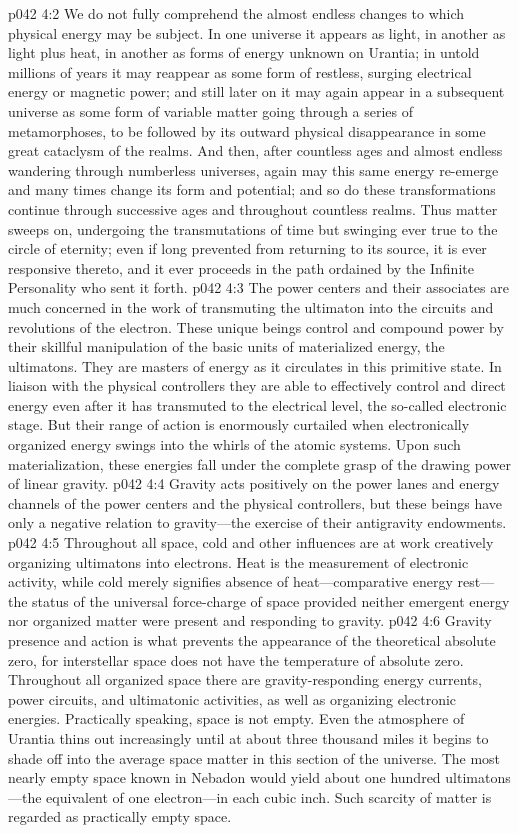 \vs p042 4:2 We do not fully comprehend the almost endless changes to which physical energy may be subject. In one universe it appears as light, in another as light plus heat, in another as forms of energy unknown on Urantia; in untold millions of years it may reappear as some form of restless, surging electrical energy or magnetic power; and still later on it may again appear in a subsequent universe as some form of variable matter going through a series of metamorphoses, to be followed by its outward physical disappearance in some great cataclysm of the realms. And then, after countless ages and almost endless wandering through numberless universes, again may this same energy re\hyp{}emerge and many times change its form and potential; and so do these transformations continue through successive ages and throughout countless realms. Thus matter sweeps on, undergoing the transmutations of time but swinging ever true to the circle of eternity; even if long prevented from returning to its source, it is ever responsive thereto, and it ever proceeds in the path ordained by the Infinite Personality who sent it forth.\plusone
\vs p042 4:3 The power centers and their associates are much concerned in the work of transmuting the ultimaton into the circuits and revolutions of the electron. These unique beings control and compound power by their skillful manipulation of the basic units of materialized energy, the ultimatons. They are masters of energy as it circulates in this primitive state. In liaison with the physical controllers they are able to effectively control and direct energy even after it has transmuted to the electrical level, the so\hyp{}called electronic stage. But their range of action is enormously curtailed when electronically organized energy swings into the whirls of the atomic systems. Upon such materialization, these energies fall under the complete grasp of the drawing power of linear gravity.
\vs p042 4:4 Gravity acts positively on the power lanes and energy channels of the power centers and the physical controllers, but these beings have only a negative relation to gravity---the exercise of their antigravity endowments.
\vs p042 4:5 Throughout all space, cold and other influences are at work creatively organizing ultimatons into electrons. Heat is the measurement of electronic activity, while cold merely signifies absence of heat---comparative energy rest---the status of the universal force\hyp{}charge of space provided neither emergent energy nor organized matter were present and responding to gravity.
\vs p042 4:6 Gravity presence and action is what prevents the appearance of the theoretical absolute zero, for interstellar space does not have the temperature of absolute zero. Throughout all organized space there are gravity\hyp{}responding energy currents, power circuits, and ultimatonic activities, as well as organizing electronic energies. Practically speaking, space is not empty. Even the atmosphere of Urantia thins out increasingly until at about three thousand miles it begins to shade off into the average space matter in this section of the universe. The most nearly empty space known in Nebadon would yield about one hundred ultimatons---the equivalent of one electron---in each cubic inch. Such scarcity of matter is regarded as practically empty space.
